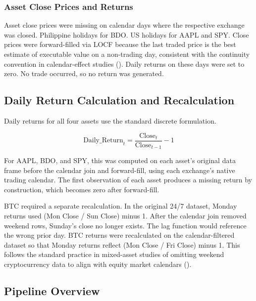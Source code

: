 \subsubsection{Asset Close Prices and Returns}

Asset close prices were missing on calendar days where the respective exchange was closed. Philippine holidays for BDO. US holidays for AAPL and SPY. Close prices were forward-filled via LOCF because the last traded price is the best estimate of executable value on a non-trading day, consistent with the continuity convention in calendar-effect studies (\cite{schmidbauer2018}). Daily returns on these days were set to zero. No trade occurred, so no return was generated.

\subsection{Daily Return Calculation and Recalculation}

Daily returns for all four assets use the standard discrete formulation.

\begin{equation}
\text{Daily\_Return}_t = \frac{\text{Close}_t}{\text{Close}_{t-1}} - 1
\end{equation}

For AAPL, BDO, and SPY, this was computed on each asset's original data frame before the calendar join and forward-fill, using each exchange's native trading calendar. The first observation of each asset produces a missing return by construction, which becomes zero after forward-fill.

BTC required a separate recalculation. In the original 24/7 dataset, Monday returns used (Mon Close / Sun Close) minus 1. After the calendar join removed weekend rows, Sunday's close no longer exists. The lag function would reference the wrong prior day. BTC returns were recalculated on the calendar-filtered dataset so that Monday returns reflect (Mon Close / Fri Close) minus 1. This follows the standard practice in mixed-asset studies of omitting weekend cryptocurrency data to align with equity market calendars (\cite{corbet2018}).

\subsection{Pipeline Overview}

